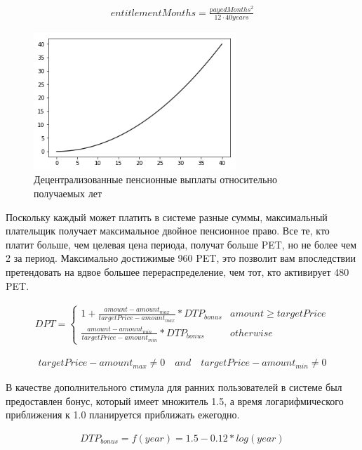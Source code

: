 \begin{eqnarray}
	entitlementMonths = \frac{payedMonths^2}{12 \cdot 40 years}
\end{eqnarray}

\begin{figure}[H]
    \centering
    \includegraphics[width=3.0in]{img/pension_years.png}
    \caption{Децентрализованные пенсионные выплаты относительно получаемых лет}
    \label{fig:pension_years}
\end{figure}

Поскольку каждый может платить в системе разные суммы, максимальный плательщик получает максимальное двойное пенсионное право. Все те, кто платит больше, чем целевая цена периода, получат больше PET, но не более чем 2 за период. Максимально достижимые 960 PET, это позволит вам впоследствии претендовать на вдвое большее перераспределение, чем тот, кто активирует 480 PET.

\begin{eqnarray}
	DPT = \begin{cases} 1 + \frac{amount-amount_{max}}
	{targetPrice - amount_{max}} 
	* DTP_{bonus} & amount \geq targetPrice\\
	\frac{amount - amount_{min}}
	{targetPrice - amount_{min}} 
	* DTP_{bonus} & otherwise\end{cases}
\end{eqnarray}

\begin{eqnarray}
targetPrice - amount_{max} \neq 0 \quad and \quad targetPrice - amount_{min} \neq 0
\end{eqnarray}

В качестве дополнительного стимула для ранних пользователей в системе был предоставлен бонус, который имеет множитель 1.5, а время логарифмического приближения к 1.0 планируется приближать ежегодно.

\begin{eqnarray}
	DTP_{bonus} = f(year) = 1.5-0.12 * log(year)
\end{eqnarray}

